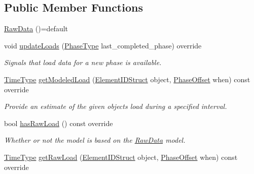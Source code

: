 \subsection*{Public Member Functions}
\begin{DoxyCompactItemize}
\item 
\hyperlink{structvt_1_1vrt_1_1collection_1_1balance_1_1_raw_data_a4879ed47b7d3da3008dc6199adc6d519}{Raw\+Data} ()=default
\item 
void \hyperlink{structvt_1_1vrt_1_1collection_1_1balance_1_1_raw_data_a4aaae24a53ead0248b873911ce560a34}{update\+Loads} (\hyperlink{namespacevt_a46ce6733d5cdbd735d561b7b4029f6d7}{Phase\+Type} last\+\_\+completed\+\_\+phase) override
\begin{DoxyCompactList}\small\item\em Signals that load data for a new phase is available. \end{DoxyCompactList}\item 
\hyperlink{namespacevt_a876a9d0cd5a952859c72de8a46881442}{Time\+Type} \hyperlink{structvt_1_1vrt_1_1collection_1_1balance_1_1_raw_data_adc3d74f514051c2b0dad8ba9b65e2d1a}{get\+Modeled\+Load} (\hyperlink{namespacevt_1_1vrt_1_1collection_1_1balance_a9f5b53fafb270212279a4757d2c4cd28}{Element\+I\+D\+Struct} object, \hyperlink{structvt_1_1vrt_1_1collection_1_1balance_1_1_phase_offset}{Phase\+Offset} when) const override
\begin{DoxyCompactList}\small\item\em Provide an estimate of the given object\textquotesingle{}s load during a specified interval. \end{DoxyCompactList}\item 
bool \hyperlink{structvt_1_1vrt_1_1collection_1_1balance_1_1_raw_data_a81391396ba96f5bc7578ac6d07d968ce}{has\+Raw\+Load} () const override
\begin{DoxyCompactList}\small\item\em Whether or not the model is based on the \hyperlink{structvt_1_1vrt_1_1collection_1_1balance_1_1_raw_data}{Raw\+Data} model. \end{DoxyCompactList}\item 
\hyperlink{namespacevt_a876a9d0cd5a952859c72de8a46881442}{Time\+Type} \hyperlink{structvt_1_1vrt_1_1collection_1_1balance_1_1_raw_data_af47711d5b5a8ec4fef25282703a4902e}{get\+Raw\+Load} (\hyperlink{namespacevt_1_1vrt_1_1collection_1_1balance_a9f5b53fafb270212279a4757d2c4cd28}{Element\+I\+D\+Struct} object, \hyperlink{structvt_1_1vrt_1_1collection_1_1balance_1_1_phase_offset}{Phase\+Offset} when) const override

\end{DoxyCompactItemize}
